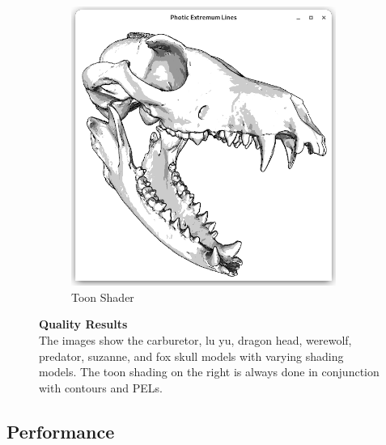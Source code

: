 \documentclass[9pt,fleqn,twoside,twocolumn]{stdglobal}
\begin{document}
\begin{figure}
\begin{subfigure}[t]{0.19\textwidth}
        \includegraphics[width=0.95\textwidth,trim={15px 15 15 50},clip]{images/results/skull-contours-pel-toon.png}
        \caption{Toon Shader}
      \end{subfigure}%
      \caption{%
        \textbf{Quality Results}\\
        The images show the carburetor, lu yu, dragon head, werewolf, predator, suzanne, and fox skull models with varying shading models.
        The toon shading on the right is always done in conjunction with contours and PELs.
      }
      \label{fig:quality-results}
    \end{figure}

  \subsection{Performance}
\end{document}
